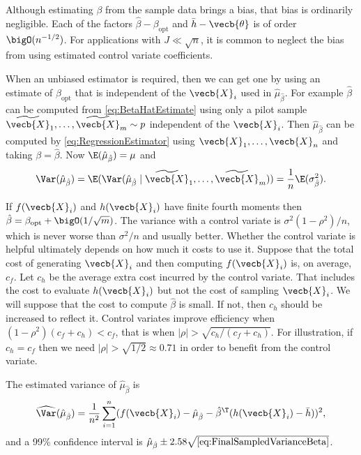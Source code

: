 Although estimating $\beta$ from the sample data brings a bias, that bias is ordinarily negligible. Each of the factors $\hat{\beta} - \beta_{\text{opt}}$ and $\bar{h} - \vecb{\theta}$ is of order $\bigO(n^{-1/2})$. For applications with $J \ll \sqrt{n}$, it is common to neglect the bias from using estimated control variate coefficients.

When an unbiased estimator is required, then we can get one by using an estimate of $\beta_{\text{opt}}$ that is independent of the $\vecb{X}_i$ used in $\hat{\mu}_{\hat{\beta}}$. For example $\hat{\beta}$ can be computed from \cref{eq:BetaHatEstimate} using only a pilot sample $\widetilde{\vecb{X}}_1, \dots, \widetilde{\vecb{X}}_m \sim p$ independent of the $\vecb{X}_i$. Then $\hat{\mu}_{\hat{\beta}}$ can be computed by \cref{eq:RegressionEstimator} using $\vecb{X}_1, \dots, \vecb{X}_n$ and taking $\beta = \hat{\beta}$. Now $\E(\hat{\mu}_{\hat{\beta}}) = \mu$ and
\begin{equation}
	\Var(\hat{\mu}_{\hat{\beta}}) = \E(\Var(\hat{\mu}_{\hat{\beta}} \mid \widetilde{\vecb{X}}_1, \dots, \widetilde{\vecb{X}}_m)) = \frac{1}{n} \E(\sigma^2_{\hat{\beta}}).
	\label{eq:VarianceTotalBeta}
\end{equation}

If $f(\vecb{X}_i)$ and $h(\vecb{X}_i)$ have finite fourth moments then $\hat{\beta} = \beta_{\text{opt}} + \bigO(1/\sqrt{m})$. The variance with a control variate is $\sigma^2(1-\rho^2)/n$, which is never worse than $\sigma^2/n$ and usually better. Whether the control variate is helpful ultimately depends on how much it costs to use it. Suppose that the total cost of generating $\vecb{X}_i$ and then computing $f(\vecb{X}_i)$ is, on average, $c_f$. Let $c_h$ be the average extra cost incurred by the control variate. That includes the cost to evaluate $h(\vecb{X}_i)$ but not the cost of sampling $\vecb{X}_i$. We will suppose that the cost to compute $\hat{\beta}$ is small. If not, then $c_h$ should be increased to reflect it. Control variates improve efficiency when $(1-\rho^2)(c_f + c_h) < c_f$, that is when $|\rho| > \sqrt{c_h / (c_f + c_h)}$. For illustration, if $c_h = c_f$ then we need $|\rho| > \sqrt{1/2} \approx 0.71$ in order to benefit from the control variate.

The estimated variance of $\hat{\mu}_{\hat{\beta}}$ is
\begin{equation}
	\widehat{\Var}(\hat{\mu}_{\hat{\beta}}) = \frac{1}{n^2} \sum_{i=1}^n (f(\vecb{X}_i) - \hat{\mu}_{\hat{\beta}} - \hat{\beta}^{\T} (h(\vecb{X}_i) - \bar{h}))^2,
	\label{eq:FinalSampledVarianceBeta}
\end{equation}
and a 99\% confidence interval is $\hat{\mu}_{\hat{\beta}} \pm 2.58 \sqrt{\cref{eq:FinalSampledVarianceBeta}}$.

